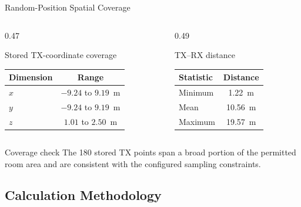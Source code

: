 \begin{frame}[t,shrink=8]{Random-Position Spatial Coverage}
    \begin{columns}[T,onlytextwidth]
        \begin{column}{0.47\textwidth}
            \begin{block}{Stored TX-coordinate coverage}
                \centering
                \begin{tabular}{@{}lc@{}}
                    \toprule
                    \textbf{Dimension} & \textbf{Range} \\
                    \midrule
                    $x$ & $-9.24$ to $9.19$~m \\
                    $y$ & $-9.24$ to $9.19$~m \\
                    $z$ & $1.01$ to $2.50$~m \\
                    \bottomrule
                \end{tabular}
            \end{block}
        \end{column}
        \begin{column}{0.49\textwidth}
            \begin{block}{TX--RX distance}
                \centering
                \begin{tabular}{@{}lc@{}}
                    \toprule
                    \textbf{Statistic} & \textbf{Distance} \\
                    \midrule
                    Minimum & 1.22~m \\
                    Mean & 10.56~m \\
                    Maximum & 19.57~m \\
                    \bottomrule
                \end{tabular}
            \end{block}
        \end{column}
    \end{columns}
    \begin{exampleblock}{Coverage check}
        The 180 stored TX points span a broad portion of the permitted room
        area and are consistent with the configured sampling constraints.
    \end{exampleblock}
\end{frame}

\subsection{Calculation Methodology}

